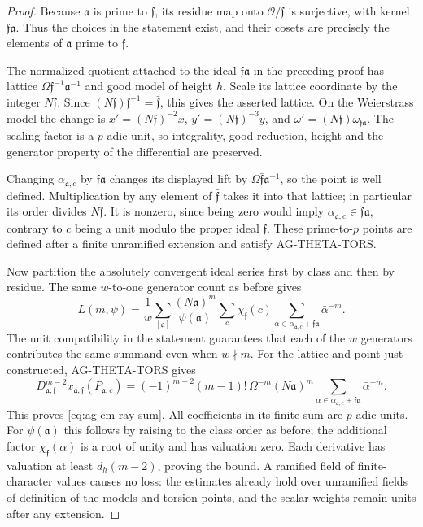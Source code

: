 \documentclass[11pt,a4paper]{article}
\begin{document}
\begin{proof}
Because $\mathfrak a$ is prime to $\mathfrak f$, its residue
map onto $\mathcal O/\mathfrak f$ is surjective, with kernel
$\mathfrak f\mathfrak a$. Thus the choices in the statement
exist, and their cosets are precisely the elements of
$\mathfrak a$ prime to $\mathfrak f$.

The normalized quotient attached to the ideal
$\mathfrak f\mathfrak a$ in the preceding proof has lattice
$\Omega\mathfrak f^{-1}\mathfrak a^{-1}$ and good model of
height $h$. Scale its lattice coordinate by the integer
$N\mathfrak f$. Since
$(N\mathfrak f)\mathfrak f^{-1}=\bar{\mathfrak f}$, this
gives the asserted lattice. On the Weierstrass model the change
is $x'=(N\mathfrak f)^{-2}x$,
$y'=(N\mathfrak f)^{-3}y$, and
$\omega'=(N\mathfrak f)\omega_{\mathfrak f\mathfrak a}$.
The scaling factor is a $p$-adic unit, so integrality, good
reduction, height and the generator property of the differential
are preserved.

Changing $\alpha_{\mathfrak a,c}$ by
$\mathfrak f\mathfrak a$ changes its displayed lift by
$\Omega\bar{\mathfrak f}\mathfrak a^{-1}$, so the point is
well defined. Multiplication by any element of
$\bar{\mathfrak f}$ takes it into that lattice; in particular
its order divides $N\mathfrak f$. It is nonzero, since being
zero would imply
$\alpha_{\mathfrak a,c}\in\mathfrak f\mathfrak a$, contrary
to $c$ being a unit modulo the proper ideal $\mathfrak f$.
These prime-to-$p$ points are defined after a finite unramified
extension and satisfy AG-THETA-TORS.

Now partition the absolutely convergent ideal series first by
class and then by residue. The same $w$-to-one generator count
as before gives
\[
 L(m,\psi)=\frac1w\sum_{[\mathfrak a]}
   \frac{(N\mathfrak a)^m}{\psi(\mathfrak a)}
   \sum_c\chi_{\mathfrak f}(c)
      \sum_{\alpha\in\alpha_{\mathfrak a,c}
                       +\mathfrak f\mathfrak a}\bar\alpha^{-m}.
\]
The unit compatibility in the statement guarantees that each
of the $w$ generators contributes the same summand even when
$w\nmid m$. For the lattice and point just constructed,
AG-THETA-TORS gives
\[
 D_{\mathfrak a,\mathfrak f}^{m-2}
     x_{\mathfrak a,\mathfrak f}(P_{\mathfrak a,c})
  =(-1)^{m-2}(m-1)!\,\Omega^{-m}(N\mathfrak a)^m
       \sum_{\alpha\in\alpha_{\mathfrak a,c}
                        +\mathfrak f\mathfrak a}\bar\alpha^{-m}.
\]
This proves \eqref{eq:ag-cm-ray-sum}. All coefficients in its
finite sum are $p$-adic units. For $\psi(\mathfrak a)$ this
follows by raising to the class order as before; the additional
factor $\chi_{\mathfrak f}(\alpha)$ is a root of unity and
has valuation zero. Each derivative has valuation at least
$d_h(m-2)$, proving the bound. A ramified field of finite-character
values causes no loss: the estimates already hold over unramified
fields of definition of the models and torsion points, and
the scalar weights remain units after any extension.
\end{proof}
\end{document}
